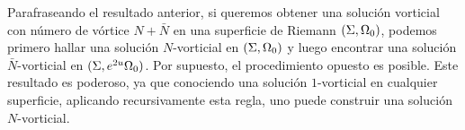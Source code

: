  Parafraseando el resultado anterior, si queremos obtener una solución vorticial con número de vórtice $N+\bar N$ en una superficie de Riemann $(\Sigma,\Omega_0)$, podemos primero hallar una solución $N$-vorticial en $(\Sigma,\Omega_0)$ y luego encontrar una solución $\bar N$-vorticial en $(\Sigma,e^{2u}\Omega_0)$. Por supuesto, el procedimiento opuesto es posible. Este resultado es poderoso, ya que conociendo una solución $1$-vorticial en cualquier superficie, aplicando recursivamente esta regla, uno puede construir una solución $N$-vorticial.